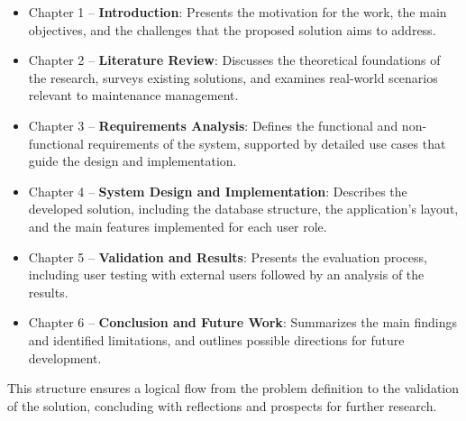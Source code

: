 \begin{itemize}
    \item Chapter 1 – \textbf{Introduction}: Presents the motivation for the work, the main objectives, and the challenges that the proposed solution aims to address.
    \item Chapter 2 – \textbf{Literature Review}: Discusses the theoretical foundations of the research, surveys existing solutions, and examines real-world scenarios relevant to maintenance management.
    \item Chapter 3 – \textbf{Requirements Analysis}: Defines the functional and non-functional requirements of the system, supported by detailed use cases that guide the design and implementation.
    \item Chapter 4 – \textbf{System Design and Implementation}: Describes the developed solution, including the database structure, the application's layout, and the main features implemented for each user role.
    \item Chapter 5 – \textbf{Validation and Results}: Presents the evaluation process, including user testing with external users followed by an analysis of the results.
    \item Chapter 6 – \textbf{Conclusion and Future Work}: Summarizes the main findings and identified limitations, and outlines possible directions for future development.
\end{itemize}

This structure ensures a logical flow from the problem definition to the validation of the solution, concluding with reflections and prospects for further research.

